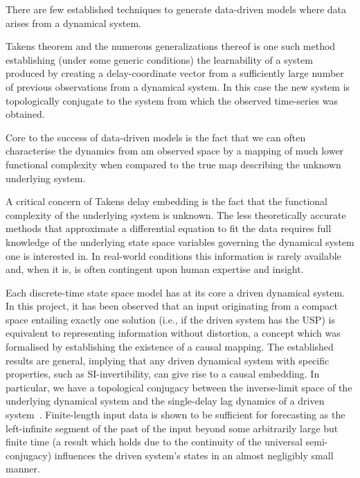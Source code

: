 
There are few established techniques to generate data-driven models where data arises from a dynamical system.

Takens theorem and the numerous generalizations thereof is one such method establishing (under some generic conditions) the learnability of a system produced by creating a delay-coordinate vector from a sufficiently large number of previous observations from a dynamical system. 
In this case the new system is topologically conjugate to the system from which the observed time-series was obtained.

Core to the success of data-driven models is the fact that we can often characterise the dynamics from am observed space by a mapping of much lower functional complexity when compared to the true map describing the unknown underlying system. 

A critical concern of Takens delay embedding is the fact that the functional complexity of the underlying system is unknown.
The less theoretically accurate methods that approximate a differential equation to fit the data requires full knowledge of the underlying state space variables governing the dynamical system one is interested in. 
In real-world conditions this information is rarely available and, when it is, is often contingent upon human expertise and insight. 

Each discrete-time state space model has at its core a driven dynamical system. 
In this project, it has been observed that an input originating from a compact space entailing exactly one solution (i.e., if the driven system has the USP) is equivalent to representing information without distortion, a concept which was formalised by establishing the existence of a causal mapping. 
The established results are general, implying that any driven dynamical system with specific properties, such as SI-invertibility, can give rise to a causal embedding. 
In particular, we have a topological conjugacy between the inverse-limit space of the underlying dynamical system and the single-delay lag dynamics of a driven system~\cite{manjunath2013echo}.
Finite-length input data is shown to be sufficient for forecasting as the left-infinite segment of the past of the input beyond some arbitrarily large but finite time (a result which holds due to the continuity of the universal semi-conjugacy) influences the driven system's states in an almost negligibly small manner.

